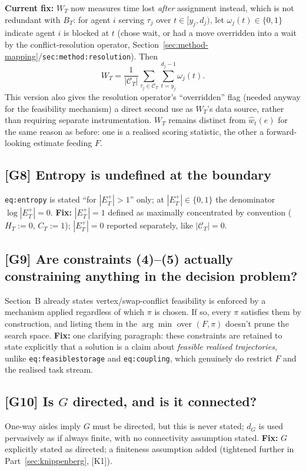 \documentclass[11pt]{article}
\begin{document}
\textbf{Current fix:} $W_T$ now measures time lost \emph{after} assignment
instead, which is not redundant with $B_T$: for agent $i$ serving $\tau_j$ over
$t\in[y_j,d_j)$, let $\omega_j(t)\in\{0,1\}$ indicate agent $i$ is blocked at
$t$ (chose wait, or had a move overridden into a wait by the conflict-resolution
operator, Section~\ref{sec:method-mapping}/\texttt{sec:method:resolution}).
Then
\[
W_T = \frac{1}{|\mathcal{C}_T|} \sum_{\tau_j\in\mathcal{C}_T}
      \sum_{t=y_j}^{d_j-1} \omega_j(t).
\]
This version also gives the resolution operator's ``overridden'' flag (needed
anyway for the feasibility mechanism) a direct second use as $W_T$'s data
source, rather than requiring separate instrumentation. $W_T$ remains distinct
from $\hat w_t(e)$ for the same reason as before: one is a realised scoring
statistic, the other a forward-looking estimate feeding $F$.

\subsection*{[G8] Entropy is undefined at the boundary}
\texttt{eq:entropy} is stated ``for $|E_T^+| > 1$'' only; at
$|E_T^+|\in\{0,1\}$ the denominator $\log|E_T^+|=0$. \textbf{Fix:}
$|E_T^+|=1$ defined as maximally concentrated by convention ($H_T := 0$,
$C_T := 1$); $|E_T^+|=0$ reported separately, like $|\mathcal{C}_T|=0$.

\subsection*{[G9] Are constraints (4)--(5) actually constraining anything in the decision problem?}
Section~B already states vertex/swap-conflict feasibility is enforced by a
mechanism applied regardless of which $\pi$ is chosen. If so, every $\pi$
satisfies them by construction, and listing them in the $\arg\min$ over
$(F,\pi)$ doesn't prune the search space. \textbf{Fix:} one clarifying
paragraph: these constraints are retained to state explicitly that a
solution is a claim about \emph{feasible realised trajectories}, unlike
\texttt{eq:feasiblestorage} and \texttt{eq:coupling}, which genuinely do
restrict $F$ and the realised task stream.

\subsection*{[G10] Is \texorpdfstring{$G$}{G} directed, and is it connected?}
One-way aisles imply $G$ must be directed, but this is never stated; $d_G$ is
used pervasively as if always finite, with no connectivity assumption
stated. \textbf{Fix:} $G$ explicitly stated as directed; a finiteness
assumption added (tightened further in Part~\ref{sec:knippenberg}, [K1]).
\end{document}
